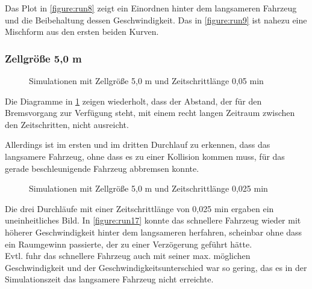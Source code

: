 Das Plot in \cref{figure:run8} zeigt ein Einordnen hinter dem langsameren Fahrzeug und die Beibehaltung dessen Geschwindigkeit.
Das in \cref{figure:run9} ist nahezu eine Mischform aus den ersten beiden Kurven.


\subsubsection{Zellgröße 5,0 m}

\begin{figure}[hptb]
  \centering 
   \qquad 
   \qquad 
  \caption{Simulationen mit Zellgröße 5,0 m und Zeitschrittlänge 0,05 min} 
  \label{figure:run14-16}
\end{figure}

Die Diagramme in \cref{figure:run14-16} zeigen wiederholt, dass der Abstand, der für den Bremsvorgang zur Verfügung steht, mit einem recht langen Zeitraum zwischen den Zeitschritten, nicht ausreicht.

Allerdings ist im ersten und im dritten Durchlauf zu erkennen, dass das langsamere Fahrzeug, ohne dass es zu einer Kollision kommen muss, für das gerade beschleunigende Fahrzeug abbremsen konnte. 

\begin{figure}[hptb]
  \centering 
   \qquad 
   \qquad 
  \caption{Simulationen mit Zellgröße 5,0 m und Zeitschrittlänge 0,025 min} 
  \label{figure:run17-19}
\end{figure}

Die drei Durchläufe mit einer Zeitschrittlänge von 0,025 min ergaben ein uneinheitliches Bild.
In \cref{figure:run17} konnte das schnellere Fahrzeug wieder mit höherer Geschwindigkeit hinter dem langsameren herfahren, scheinbar ohne dass ein Raumgewinn passierte, der zu einer Verzögerung geführt hätte.
\\
Evtl. fuhr das schnellere Fahrzeug auch mit seiner max. möglichen Geschwindigkeit und der Geschwindigkeitsunterschied war so gering, das es in der Simulationszeit das langsamere Fahrzeug nicht erreichte.

